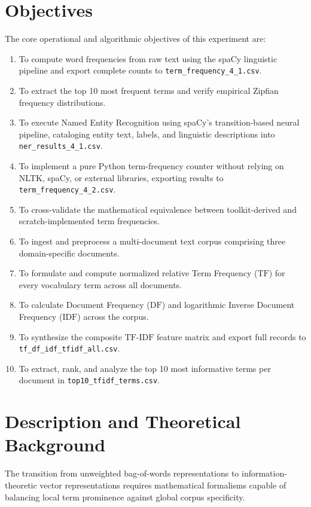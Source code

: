 \section{Objectives}
The core operational and algorithmic objectives of this experiment are:
\begin{enumerate}[label=\textbf{\arabic*.}]
    \item To compute word frequencies from raw text using the spaCy linguistic pipeline and export complete counts to \texttt{term\_frequency\_4\_1.csv}.
    \item To extract the top 10 most frequent terms and verify empirical Zipfian frequency distributions.
    \item To execute Named Entity Recognition using spaCy's transition-based neural pipeline, cataloging entity text, labels, and linguistic descriptions into \texttt{ner\_results\_4\_1.csv}.
    \item To implement a pure Python term-frequency counter without relying on NLTK, spaCy, or external libraries, exporting results to \texttt{term\_frequency\_4\_2.csv}.
    \item To cross-validate the mathematical equivalence between toolkit-derived and scratch-implemented term frequencies.
    \item To ingest and preprocess a multi-document text corpus comprising three domain-specific documents.
    \item To formulate and compute normalized relative Term Frequency ($\text{TF}$) for every vocabulary term across all documents.
    \item To calculate Document Frequency ($\text{DF}$) and logarithmic Inverse Document Frequency ($\text{IDF}$) across the corpus.
    \item To synthesize the composite $\text{TF-IDF}$ feature matrix and export full records to \texttt{tf\_df\_idf\_tfidf\_all.csv}.
    \item To extract, rank, and analyze the top 10 most informative terms per document in \texttt{top10\_tfidf\_terms.csv}.
\end{enumerate}

\section{Description and Theoretical Background}
The transition from unweighted bag-of-words representations to information-theoretic vector representations requires mathematical formalisms capable of balancing local term prominence against global corpus specificity.

